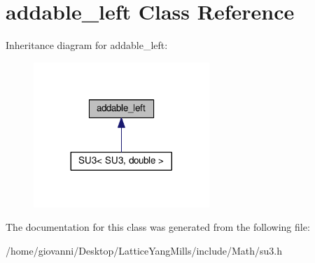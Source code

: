 \hypertarget{classtao_1_1operators_1_1addable__left}{}\section{addable\+\_\+left Class Reference}
\label{classtao_1_1operators_1_1addable__left}


Inheritance diagram for addable\+\_\+left\+:\nopagebreak
\begin{figure}[H]
\begin{center}
\leavevmode
\includegraphics[width=188pt]{classtao_1_1operators_1_1addable__left__inherit__graph}
\end{center}
\end{figure}


The documentation for this class was generated from the following file\+:\begin{DoxyCompactItemize}
\item 
/home/giovanni/\+Desktop/\+Lattice\+Yang\+Mills/include/\+Math/su3.\+h\end{DoxyCompactItemize}
